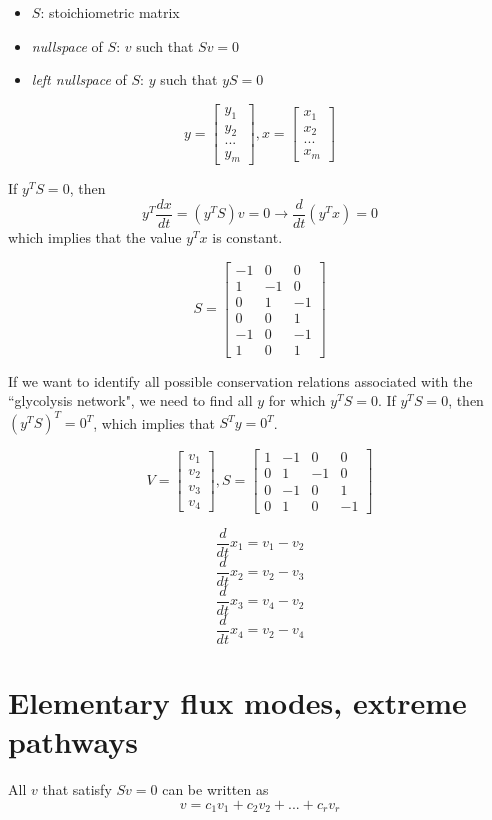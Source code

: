 \documentclass[10pt]{article}
\newenvironment{mitemize}
{
  \begin{itemize}
  \setlength{\itemsep}{1pt}
  \setlength{\parskip}{0pt}
  \setlength{\parsep}{0pt}}{\end{itemize}
}
\begin{document}
\begin{mitemize}
  \item $S$: stoichiometric matrix
  \item \emph{nullspace} of $S$: $v$ such that $S v = 0$
  \item \emph{left nullspace} of $S$: $y$ such that $y S = 0$
\end{mitemize}

\[ y = \begin{bmatrix} y_1 \\ y_2 \\ ...\\ y_m \end{bmatrix}, x = \begin{bmatrix} x_1 \\ x_2 \\ ...\\ x_m \end{bmatrix} \] 

If $y^T S = 0$, then \[ y^T \frac{dx}{dt} = (y^T S)v = 0 \rightarrow \frac{d}{dt}(y^T x) = 0 \] which implies that the value $y^T x$ is constant.

\[ S = \begin{bmatrix} -1 & 0 & 0 \\ 1 & -1 & 0 \\ 0 & 1 & -1 \\ 0 & 0 & 1 \\ -1 & 0 & -1 \\ 1 & 0 & 1 \end{bmatrix} \]

If we want to identify all possible conservation relations associated with the ``glycolysis network", we need to find all $y$ for which $y^T S = 0$. If $y^T S = 0$, then $(y^T S)^T = 0^T$, which implies that $S^T y = 0^T$.

\[ V = \begin{bmatrix} v_1 \\ v_2 \\ v_3 \\ v_4 \end{bmatrix}, S = \begin{bmatrix} 1 & -1 & 0 & 0 \\ 0 & 1 & -1 & 0 \\ 0 & -1 & 0 & 1 \\ 0 & 1 & 0 & -1 \end{bmatrix} \]

 \[ \frac{d}{dt}x_1 = v_1 - v_2 \]
 \[ \frac{d}{dt}x_2 = v_2 - v_3 \]
 \[ \frac{d}{dt}x_3 = v_4 - v_2 \]
 \[ \frac{d}{dt}x_4 = v_2 - v_4 \]
 
 \section*{Elementary flux modes, extreme pathways}
 All $v$ that satisfy $S v = 0$ can be written as \[ v = c_1 v_1 + c_2 v_2 + ... + c_r v_r \]
\end{document}

